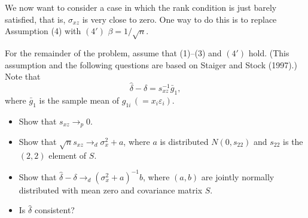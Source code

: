 \documentclass[12pt, letterpaper, onecolumn]{exam}
\begin{document}
We now want to consider a case in which the rank condition is just barely satisfied, that is, $\sigma_{xz}$ is very close to zero. One way to do this is to replace Assumption (4) with $(4')$ $\beta = 1/\sqrt{n}$.

For the remainder of the problem, assume that (1)--(3) and $(4')$ hold. (This assumption and the following questions are based on Staiger and Stock (1997).) Note that
$$
    \hat\delta - \delta = s_{xz}^{-1}\bar g_1,
$$
where $\bar g_1$ is the sample mean of $g_{1i}\,(=x_i\varepsilon_i)$.

\begin{itemize}
    \item[(c)] Show that $s_{xz} \to_p 0$.
    \item[(d)] Show that $\sqrt{n}s_{xz} \to_d \sigma_x^2 + a$, where $a$ is distributed $N(0,s_{22})$ and $s_{22}$ is the $(2,2)$ element of $S$.
    \item[(e)] Show that $\hat\delta - \delta \to_d (\sigma_x^2+a)^{-1}b$, where $(a,b)$ are jointly normally distributed with mean zero and covariance matrix $S$.
    \item[(f)] Is $\hat\delta$ consistent?
\end{itemize}
\end{document}
